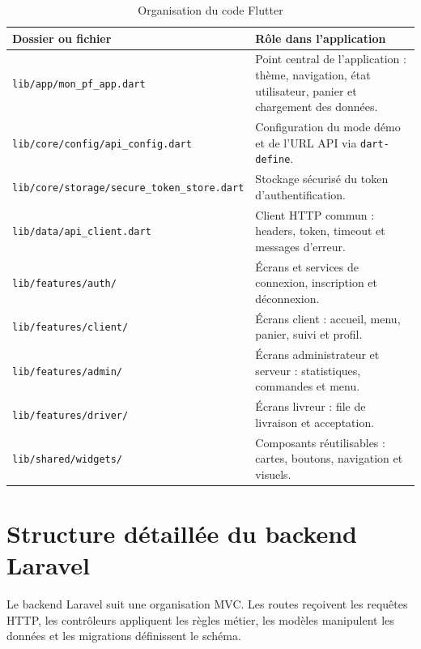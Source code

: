 \documentclass[12pt,a4paper]{report}
\begin{document}
\begin{longtable}{p{5cm}p{9cm}}
\caption{Organisation du code Flutter}\\
\toprule
\textbf{Dossier ou fichier} & \textbf{Rôle dans l'application}\\
\midrule
\nolinkurl{lib/app/mon_pf_app.dart} & Point central de l'application : thème, navigation, état utilisateur, panier et chargement des données.\\
\nolinkurl{lib/core/config/api_config.dart} & Configuration du mode démo et de l'URL API via \texttt{dart-define}.\\
\nolinkurl{lib/core/storage/secure_token_store.dart} & Stockage sécurisé du token d'authentification.\\
\nolinkurl{lib/data/api_client.dart} & Client HTTP commun : headers, token, timeout et messages d'erreur.\\
\nolinkurl{lib/features/auth/} & Écrans et services de connexion, inscription et déconnexion.\\
\nolinkurl{lib/features/client/} & Écrans client : accueil, menu, panier, suivi et profil.\\
\nolinkurl{lib/features/admin/} & Écrans administrateur et serveur : statistiques, commandes et menu.\\
\nolinkurl{lib/features/driver/} & Écrans livreur : file de livraison et acceptation.\\
\nolinkurl{lib/shared/widgets/} & Composants réutilisables : cartes, boutons, navigation et visuels.\\
\bottomrule
\end{longtable}

\section{Structure détaillée du backend Laravel}
Le backend Laravel suit une organisation MVC. Les routes reçoivent les requêtes HTTP, les contrôleurs appliquent les règles métier, les modèles manipulent les données et les migrations définissent le schéma.
\end{document}
